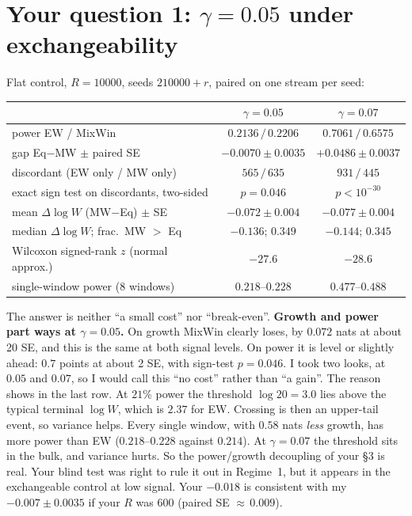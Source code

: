 \documentclass[11pt]{article}
\begin{document}
\section{Your question 1: \texorpdfstring{$\gamma=0.05$}{gamma=0.05} under exchangeability}\label{sec:g05}
Flat control, $R=10000$, seeds $210000+r$, paired on one stream per seed:
\begin{center}\small
\begin{tabular}{lcc}
\toprule
 & $\gamma=0.05$ & $\gamma=0.07$\\
\midrule
power EW / MixWin & $0.2136\,/\,0.2206$ & $0.7061\,/\,0.6575$\\
gap Eq$-$MW $\pm$ paired SE & $\mathbf{-0.0070\pm0.0035}$ & $+0.0486\pm0.0037$\\
discordant (EW only / MW only) & $565\,/\,635$ & $931\,/\,445$\\
exact sign test on discordants, two-sided & $p=0.046$ & $p<10^{-30}$\\
mean $\Delta\log W$ (MW$-$Eq) $\pm$ SE & $\mathbf{-0.072\pm0.004}$ & $-0.077\pm0.004$\\
median $\Delta\log W$; frac.\ MW $>$ Eq & $-0.136$; $0.349$ & $-0.144$; $0.345$\\
Wilcoxon signed-rank $z$ (normal approx.) & $-27.6$ & $-28.6$\\
single-window power (8 windows) & $0.218$--$0.228$ & $0.477$--$0.488$\\
\bottomrule
\end{tabular}
\end{center}
The answer is neither ``a small cost'' nor ``break-even''. \textbf{Growth and power part ways at $\gamma=0.05$.}
On growth MixWin clearly loses, by $0.072$ nats at about 20 SE, and this is the same at both signal levels.
On power it is level or slightly ahead: $0.7$ points at about 2 SE, with sign-test $p=0.046$. I took two looks, at $0.05$ and $0.07$, so I would call this ``no cost'' rather than ``a gain''.
The reason shows in the last row. At $21\%$ power the threshold $\log20=3.0$ lies above the typical terminal $\log W$, which is $2.37$ for EW. Crossing is then an upper-tail event, so variance helps. Every single window, with $0.58$ nats \emph{less} growth, has more power than EW ($0.218$--$0.228$ against $0.214$). At $\gamma=0.07$ the threshold sits in the bulk, and variance hurts.
So the power/growth decoupling of your \S3 is real. Your blind test was right to rule it out in Regime~1, but it appears in the exchangeable control at low signal. Your $-0.018$ is consistent with my $-0.007\pm0.0035$ if your $R$ was $600$ (paired SE ${\approx}\,0.009$).
\end{document}
